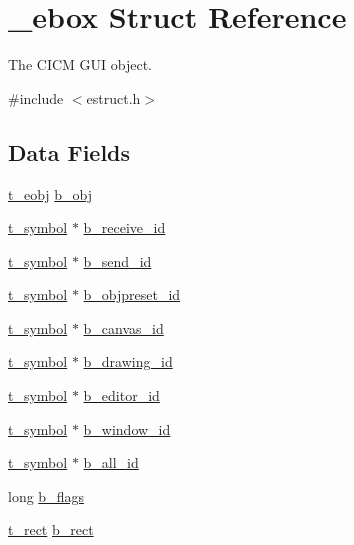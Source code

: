 \hypertarget{struct__ebox}{\section{\-\_\-ebox Struct Reference}
\label{struct__ebox}
}


The C\-I\-C\-M G\-U\-I object.  




{\ttfamily \#include $<$estruct.\-h$>$}

\subsection*{Data Fields}
\begin{DoxyCompactItemize}
\item 
\hyperlink{struct__eobj}{t\-\_\-eobj} \hyperlink{struct__ebox_a384a670299e98768527fbe457de9a38a}{b\-\_\-obj}
\item 
\hyperlink{struct__symbol}{t\-\_\-symbol} $\ast$ \hyperlink{struct__ebox_a3fb2b6968877ffd009753ccc0fe96769}{b\-\_\-receive\-\_\-id}
\item 
\hyperlink{struct__symbol}{t\-\_\-symbol} $\ast$ \hyperlink{struct__ebox_ac59460230e622f821660b599e2f96ca9}{b\-\_\-send\-\_\-id}
\item 
\hyperlink{struct__symbol}{t\-\_\-symbol} $\ast$ \hyperlink{struct__ebox_adc377263d208d1051f4a0997868b1155}{b\-\_\-objpreset\-\_\-id}
\item 
\hyperlink{struct__symbol}{t\-\_\-symbol} $\ast$ \hyperlink{struct__ebox_ac0251c6969a1032f8f50d076e909fb3e}{b\-\_\-canvas\-\_\-id}
\item 
\hyperlink{struct__symbol}{t\-\_\-symbol} $\ast$ \hyperlink{struct__ebox_a153f9c9929d722ecb29217f3fb0914c9}{b\-\_\-drawing\-\_\-id}
\item 
\hyperlink{struct__symbol}{t\-\_\-symbol} $\ast$ \hyperlink{struct__ebox_adf8c80c6ea45ad810c754984d98830ff}{b\-\_\-editor\-\_\-id}
\item 
\hyperlink{struct__symbol}{t\-\_\-symbol} $\ast$ \hyperlink{struct__ebox_a7033df943e798c68e3a6117785c2d79e}{b\-\_\-window\-\_\-id}
\item 
\hyperlink{struct__symbol}{t\-\_\-symbol} $\ast$ \hyperlink{struct__ebox_a0f63dcf604135dd4fbfbf43eaed53c1a}{b\-\_\-all\-\_\-id}
\item 
long \hyperlink{struct__ebox_abdae234dbd983dfbfb0592858c4ff026}{b\-\_\-flags}
\item 
\hyperlink{struct__rect}{t\-\_\-rect} \hyperlink{struct__ebox_abc70ff46c135ee9f377a038bbc05a33e}{b\-\_\-rect}

\end{DoxyCompactItemize}
